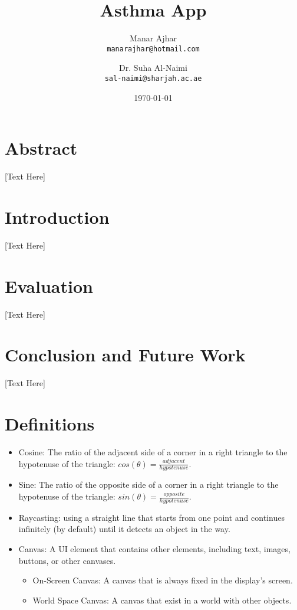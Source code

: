 \documentclass[a4paper, 12pt]{article}
\title{Asthma App}
\author{Manar Ajhar \\ \texttt{manarajhar@hotmail.com} \and Dr. Suha Al-Naimi \\ \texttt{sal-naimi@sharjah.ac.ae}}
\date{\today}
\begin{document}
\maketitle

\section*{Abstract}
[Text Here]

\section{Introduction}
[Text Here]


\section{Evaluation}
[Text Here]
\section{Conclusion and Future Work}
[Text Here]

\section{Definitions}
\begin{itemize}
    \item{Cosine: The ratio of the adjacent side of a corner in a right triangle to the hypotenuse of the triangle: $cos(\theta) = \frac{adjacent}{hypotenuse}$.}

    \item{Sine: The ratio of the opposite side of a corner in a right triangle to the hypotenuse of the triangle: $sin(\theta) = \frac{opposite}{hypotenuse}$.}
    
    \item{Raycasting: using a straight line that starts from one point and continues infinitely (by default) until it detects an object in the way.}
    
    \item{Canvas: A UI element that contains other elements, including text, images, buttons, or other canvases.}

\begin{itemize}
    \item{On-Screen Canvas: A canvas that is always fixed in the display’s screen.}
    
    \item{World Space Canvas: A canvas that exist in a world with other objects.}
\end{itemize}

\end{itemize}
\end{document}
